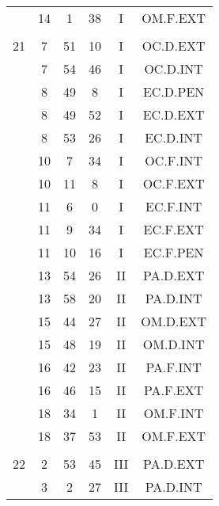 \documentclass[12pt, a4paper]{article}
\begin{document}
\begin{multicols}{3}
{\begin{tabular}{c c c c c c}
	 	 	 	 & 14 & 1 & 38 & I & OM.F.EXT\\%
	 	 	 	 & & & & & \\%
	 	 	 	21 & 7 & 51 & 10 & I & OC.D.EXT\\%
	 	 	 	 & 7 & 54 & 46 & I & OC.D.INT\\%
	 	 	 	 & 8 & 49 & 8 & I & EC.D.PEN\\%
	 	 	 	 & 8 & 49 & 52 & I & EC.D.EXT\\%
	 	 	 	 & 8 & 53 & 26 & I & EC.D.INT\\%
	 	 	 	 & 10 & 7 & 34 & I & OC.F.INT\\%
	 	 	 	 & 10 & 11 & 8 & I & OC.F.EXT\\%
	 	 	 	 & 11 & 6 & 0 & I & EC.F.INT\\%
	 	 	 	 & 11 & 9 & 34 & I & EC.F.EXT\\%
	 	 	 	 & 11 & 10 & 16 & I & EC.F.PEN\\%
	 	 	 	 & 13 & 54 & 26 & II & PA.D.EXT\\%
	 	 	 	 & 13 & 58 & 20 & II & PA.D.INT\\%
	 	 	 	 & 15 & 44 & 27 & II & OM.D.EXT\\%
	 	 	 	 & 15 & 48 & 19 & II & OM.D.INT\\%
	 	 	 	 & 16 & 42 & 23 & II & PA.F.INT\\%
	 	 	 	 & 16 & 46 & 15 & II & PA.F.EXT\\%
	 	 	 	 & 18 & 34 & 1 & II & OM.F.INT\\%
	 	 	 	 & 18 & 37 & 53 & II & OM.F.EXT\\%
	 	 	 	 & & & & & \\%
	 	 	 	22 & 2 & 53 & 45 & III & PA.D.EXT\\%
	 	 	 	 & 3 & 2 & 27 & III & PA.D.INT\\%

\end{tabular}}
\end{multicols}
\end{document}
